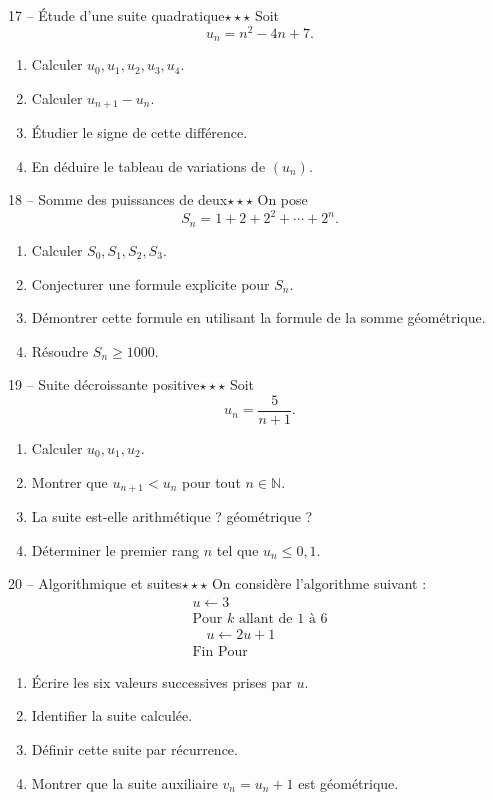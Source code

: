 \documentclass[11pt,a4paper]{article}
\newcommand{\N}{\mathbb{N}}
\newcommand{\troisetoiles}{\(\star\star\star\)}
\begin{document}
\begin{exobox}{17 -- Étude d'une suite quadratique}{\troisetoiles}
Soit
\[
u_n=n^2-4n+7.
\]
\begin{enumerate}[label=\alph*)]
  \item Calculer \(u_0,u_1,u_2,u_3,u_4\).
  \item Calculer \(u_{n+1}-u_n\).
  \item Étudier le signe de cette différence.
  \item En déduire le tableau de variations de \((u_n)\).
\end{enumerate}
\end{exobox}

\begin{exobox}{18 -- Somme des puissances de deux}{\troisetoiles}
On pose
\[
S_n=1+2+2^2+\cdots+2^n.
\]
\begin{enumerate}[label=\alph*)]
  \item Calculer \(S_0,S_1,S_2,S_3\).
  \item Conjecturer une formule explicite pour \(S_n\).
  \item Démontrer cette formule en utilisant la formule de la somme géométrique.
  \item Résoudre \(S_n\geq 1000\).
\end{enumerate}
\end{exobox}

\begin{exobox}{19 -- Suite décroissante positive}{\troisetoiles}
Soit
\[
u_n=\frac{5}{n+1}.
\]
\begin{enumerate}[label=\alph*)]
  \item Calculer \(u_0,u_1,u_2\).
  \item Montrer que \(u_{n+1}<u_n\) pour tout \(n\in\N\).
  \item La suite est-elle arithmétique ? géométrique ?
  \item Déterminer le premier rang \(n\) tel que \(u_n\leq 0{,}1\).
\end{enumerate}
\end{exobox}

\begin{exobox}{20 -- Algorithmique et suites}{\troisetoiles}
On considère l'algorithme suivant :
\[
\begin{array}{l}
u\leftarrow 3\\
\text{Pour } k \text{ allant de } 1 \text{ à } 6\\
\quad u\leftarrow 2u+1\\
\text{Fin Pour}
\end{array}
\]
\begin{enumerate}[label=\alph*)]
  \item Écrire les six valeurs successives prises par \(u\).
  \item Identifier la suite calculée.
  \item Définir cette suite par récurrence.
  \item Montrer que la suite auxiliaire \(v_n=u_n+1\) est géométrique.
\end{enumerate}
\end{exobox}
\end{document}
